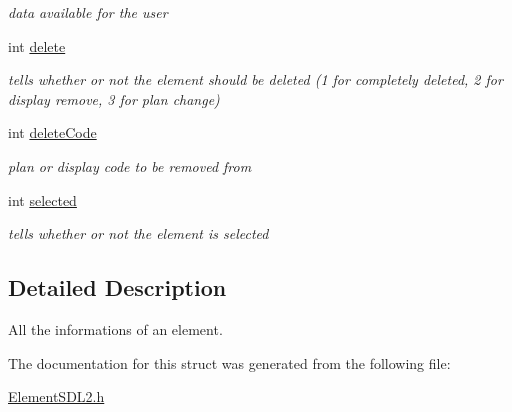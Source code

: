 \begin{DoxyCompactItemize}
\begin{DoxyCompactList}\small\item\em data available for the user \end{DoxyCompactList}\item 
int \hyperlink{structElementSDL2_a59d6b7086533d8d7da883bc882c4ef6d}{delete}\hypertarget{structElementSDL2_a59d6b7086533d8d7da883bc882c4ef6d}{}\label{structElementSDL2_a59d6b7086533d8d7da883bc882c4ef6d}

\begin{DoxyCompactList}\small\item\em tells whether or not the element should be deleted (1 for completely deleted, 2 for display remove, 3 for plan change) \end{DoxyCompactList}\item 
int \hyperlink{structElementSDL2_a1f8620d697afd711263d20dd82077cd0}{delete\+Code}\hypertarget{structElementSDL2_a1f8620d697afd711263d20dd82077cd0}{}\label{structElementSDL2_a1f8620d697afd711263d20dd82077cd0}

\begin{DoxyCompactList}\small\item\em plan or display code to be removed from \end{DoxyCompactList}\item 
int \hyperlink{structElementSDL2_a2cae92fe5dd207db485261128b82bc02}{selected}\hypertarget{structElementSDL2_a2cae92fe5dd207db485261128b82bc02}{}\label{structElementSDL2_a2cae92fe5dd207db485261128b82bc02}

\begin{DoxyCompactList}\small\item\em tells whether or not the element is selected \end{DoxyCompactList}\end{DoxyCompactItemize}


\subsection{Detailed Description}
All the informations of an element. 

The documentation for this struct was generated from the following file\+:\begin{DoxyCompactItemize}
\item 
\hyperlink{ElementSDL2_8h}{Element\+S\+D\+L2.\+h}\end{DoxyCompactItemize}
